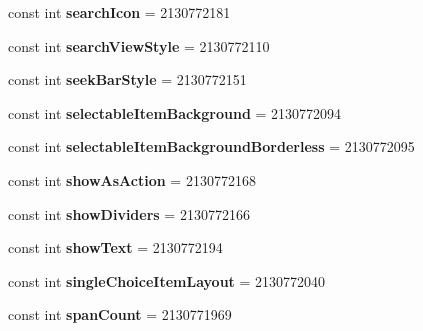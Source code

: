 \begin{DoxyCompactItemize}
const int {\bfseries search\+Icon} = 2130772181
\item 
\mbox{\label{classXaria_1_1Resource_1_1Attribute_ac8fa5032a217b636e9d3865fba1cc269}} 
const int {\bfseries search\+View\+Style} = 2130772110
\item 
\mbox{\label{classXaria_1_1Resource_1_1Attribute_ac17b44daef367e7b580e3e46904a7d79}} 
const int {\bfseries seek\+Bar\+Style} = 2130772151
\item 
\mbox{\label{classXaria_1_1Resource_1_1Attribute_ac13e1f6ba14e5af3d05099d70422b1ad}} 
const int {\bfseries selectable\+Item\+Background} = 2130772094
\item 
\mbox{\label{classXaria_1_1Resource_1_1Attribute_a3ca5b8721d7b80c7538b0376f8f7a099}} 
const int {\bfseries selectable\+Item\+Background\+Borderless} = 2130772095
\item 
\mbox{\label{classXaria_1_1Resource_1_1Attribute_aa40fdcc6a02d481417663ae2acd7df28}} 
const int {\bfseries show\+As\+Action} = 2130772168
\item 
\mbox{\label{classXaria_1_1Resource_1_1Attribute_a993d56c87b15e9a4aedeb167770bc652}} 
const int {\bfseries show\+Dividers} = 2130772166
\item 
\mbox{\label{classXaria_1_1Resource_1_1Attribute_ac92dd25c50518af79d076909c1ac9fbb}} 
const int {\bfseries show\+Text} = 2130772194
\item 
\mbox{\label{classXaria_1_1Resource_1_1Attribute_ae111ad76f32ae3001f7a97ef0e4b0693}} 
const int {\bfseries single\+Choice\+Item\+Layout} = 2130772040
\item 
\mbox{\label{classXaria_1_1Resource_1_1Attribute_ae8c90c678d4da193ebfc48bff135d45e}} 
const int {\bfseries span\+Count} = 2130771969
\item 
\mbox{\label{classXaria_1_1Resource_1_1Attribute_a7ec4aa64e81460d399c02af23fc1797e}} 

\end{DoxyCompactItemize}
